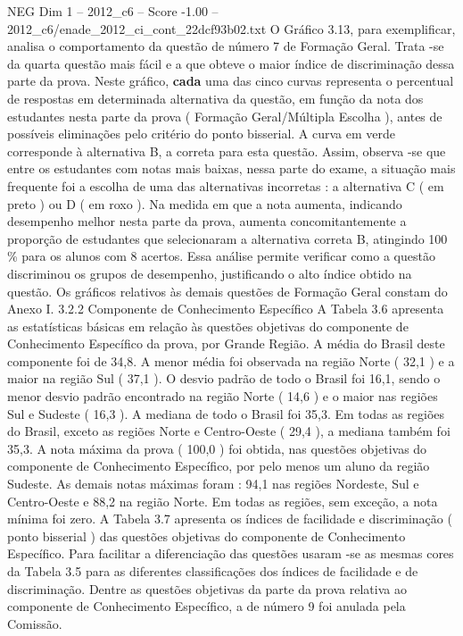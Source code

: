 \begin{textsample}{NEG Dim 1 – 2012\_c6 – Score -1.00 – 2012\_c6/enade\_2012\_ci\_cont\_22dcf93b02.txt}
O Gráfico 3.13, para exemplificar, analisa o comportamento da questão de número 7 de Formação Geral.
Trata -se da quarta questão mais fácil e a que obteve o maior índice de discriminação dessa parte da prova.
Neste gráfico, \textbf{cada} uma das cinco curvas representa o percentual de respostas em determinada alternativa da questão, em função da nota dos estudantes nesta parte da prova ( Formação Geral/Múltipla Escolha ), antes de possíveis eliminações pelo critério do ponto bisserial.
A curva em verde corresponde à alternativa B, a correta para esta questão.
Assim, observa -se que entre os estudantes com notas mais baixas, nessa parte do exame, a situação mais frequente foi a escolha de uma das alternativas incorretas : a alternativa C ( em preto ) ou D ( em roxo ).
Na medida em que a nota aumenta, indicando desempenho melhor nesta parte da prova, aumenta concomitantemente a proporção de estudantes que selecionaram a alternativa correta B, atingindo 100 \% para os alunos com 8 acertos.
Essa análise permite verificar como a questão discriminou os grupos de desempenho, justificando o alto índice obtido na questão.
Os gráficos relativos às demais questões de Formação Geral constam do Anexo I. 3.2.2 Componente de Conhecimento Específico A Tabela 3.6 apresenta as estatísticas básicas em relação às questões objetivas do componente de Conhecimento Específico da prova, por Grande Região.
A média do Brasil deste componente foi de 34,8.
A menor média foi observada na região Norte ( 32,1 ) e a maior na região Sul ( 37,1 ).
O desvio padrão de todo o Brasil foi 16,1, sendo o menor desvio padrão encontrado na região Norte ( 14,6 ) e o maior nas regiões Sul e Sudeste ( 16,3 ).
A mediana de todo o Brasil foi 35,3.
Em todas as regiões do Brasil, exceto as regiões Norte e Centro-Oeste ( 29,4 ), a mediana também foi 35,3.
A nota máxima da prova ( 100,0 ) foi obtida, nas questões objetivas do componente de Conhecimento Específico, por pelo menos um aluno da região Sudeste.
As demais notas máximas foram : 94,1 nas regiões Nordeste, Sul e Centro-Oeste e 88,2 na região Norte.
Em todas as regiões, sem exceção, a nota mínima foi zero.
A Tabela 3.7 apresenta os índices de facilidade e discriminação ( ponto bisserial ) das questões objetivas do componente de Conhecimento Específico.
Para facilitar a diferenciação das questões usaram -se as mesmas cores da Tabela 3.5 para as diferentes classificações dos índices de facilidade e de discriminação.
Dentre as questões objetivas da parte da prova relativa ao componente de Conhecimento Específico, a de número 9 foi anulada pela Comissão.

\end{textsample}
